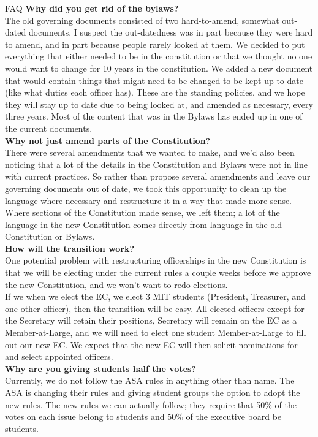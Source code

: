 \documentclass{article}
\begin{document}
\center\LARGE{FAQ}
\flushleft\normalsize
\textbf{Why did you get rid of the bylaws?}\\\smallskip
The old governing documents consisted of two hard-to-amend, somewhat out-dated documents. I suspect the out-datedness was in part because they were hard to amend, and in part because people rarely looked at them. We decided to put everything that either needed to be in the constitution or that we thought no one would want to change for 10 years in the constitution. We added a new document that would contain things that might need to be changed to be kept up to date (like what duties each officer has). These are the standing policies, and we hope they will stay up to date due to being looked at, and amended as necessary, every three years. Most of the content that was in the Bylaws has ended up in one of the current documents. \\
\bigskip
\textbf{Why not just amend parts of the Constitution?}\\\smallskip
There were several amendments that we wanted to make, and we'd also been noticing that a lot of the details in the Constitution and Bylaws were not in line with current practices. So rather than propose several amendments and leave our governing documents out of date, we took this opportunity to clean up the language where necessary and restructure it in a way that made more sense. Where sections of the Constitution made sense, we left them; a lot of the language in the new Constitution comes directly from language in the old Constitution or Bylaws.\\\bigskip
\textbf{How will the transition work?}\\\smallskip
One potential problem with restructuring officerships in the new Constitution is that we will be electing under the current rules a couple weeks before we approve the new Constitution, and we won't want to redo elections. \\
If we when we elect the EC, we elect 3 MIT students (President, Treasurer, and one other officer), then the transition will be easy. All elected officers except for the Secretary will retain their positions, Secretary will remain on the EC as a Member-at-Large, and we will need to elect one student Member-at-Large to fill out our new EC. We expect that the new EC will then solicit nominations for and select appointed officers. \\\bigskip
\textbf{Why are you giving students half the votes?}\\\smallskip
Currently, we do not follow the ASA rules in anything other than name. The ASA is changing their rules and giving student groups the option to adopt the new rules. The new rules we can actually follow; they require that 50\% of the votes on each issue belong to students and 50\% of the executive board be students. \\\bigskip
\end{document}
